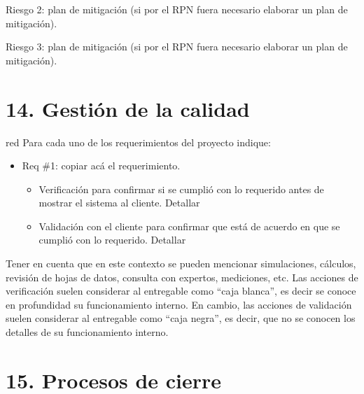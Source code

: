 \documentclass[
11pt, %
]{charter}
\begin{document}
Riesgo 2: plan de mitigación (si por el RPN fuera necesario elaborar un plan de mitigación).
 
Riesgo 3: plan de mitigación (si por el RPN fuera necesario elaborar un plan de mitigación).



\section{14. Gestión de la calidad}
\label{sec:calidad}

\begin{consigna}{red}
Para cada uno de los requerimientos del proyecto indique:
\begin{itemize} 
\item Req \#1: copiar acá el requerimiento.

\begin{itemize}
	\item Verificación para confirmar si se cumplió con lo requerido antes de mostrar el sistema al cliente. Detallar 
	\item Validación con el cliente para confirmar que está de acuerdo en que se cumplió con lo requerido. Detallar  
\end{itemize}

\end{itemize}

Tener en cuenta que en este contexto se pueden mencionar simulaciones, cálculos, revisión de hojas de datos, consulta con expertos, mediciones, etc.  Las acciones de verificación suelen considerar al entregable como ``caja blanca'', es decir se conoce en profundidad su funcionamiento interno.  En cambio, las acciones de validación suelen considerar al entregable como ``caja negra'', es decir, que no se conocen los detalles de su funcionamiento interno.

\end{consigna}

\section{15. Procesos de cierre}    
\label{sec:cierre}
\end{document}
